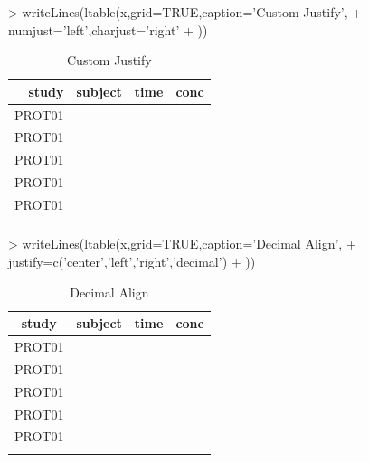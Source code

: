 \documentclass[titlepage]{article}
\begin{document}
\begin{Schunk}
\begin{Sinput}
> writeLines(ltable(x,grid=TRUE,caption='Custom Justify',
+     numjust='left',charjust='right'
+ ))
\end{Sinput}
\begin{table}[!htpb]
 \caption[Custom Justify]{Custom Justify }
 \begin{center}
  \begin{tabular}{r|l|l|l}
    \hline \hline
   study & subject & time & conc \\ \hline
   PROT01 & \verb#1001# & \verb#0# & \verb#0.12# \\ \hline
   PROT01 & \verb#1001# & \verb#1# & \verb#34.00# \\ \hline
   PROT01 & \verb#1001# & \verb#2# & \verb#5.60# \\ \hline
   PROT01 & \verb#1002# & \verb#0# & \verb#0.50# \\ \hline
   PROT01 & \verb#1002# & \verb#1# & \verb#200.00# \\ \hline
    & \verb#1002# & \verb#2# & \verb## \\ \hline
  \end{tabular}
 \end{center}
\end{table}\end{Schunk}
\begin{Schunk}
\begin{Sinput}
> writeLines(ltable(x,grid=TRUE,caption='Decimal Align',
+     justify=c('center','left','right','decimal')
+ ))
\end{Sinput}
\begin{table}[!htpb]
 \caption[Decimal Align]{Decimal Align }
 \begin{center}
  \begin{tabular}{c|l|r|r}
    \hline \hline
   study & subject & time & conc \\ \hline
   PROT01 & \verb#1001# & \verb#0# & \verb#0.12# \\ \hline
   PROT01 & \verb#1001# & \verb#1# & \verb#34   # \\ \hline
   PROT01 & \verb#1001# & \verb#2# & \verb#5.6 # \\ \hline
   PROT01 & \verb#1002# & \verb#0# & \verb#0.5 # \\ \hline
   PROT01 & \verb#1002# & \verb#1# & \verb#200   # \\ \hline
    & \verb#1002# & \verb#2# & \verb## \\ \hline
  \end{tabular}
 \end{center}
\end{table}\end{Schunk}
\end{document}
